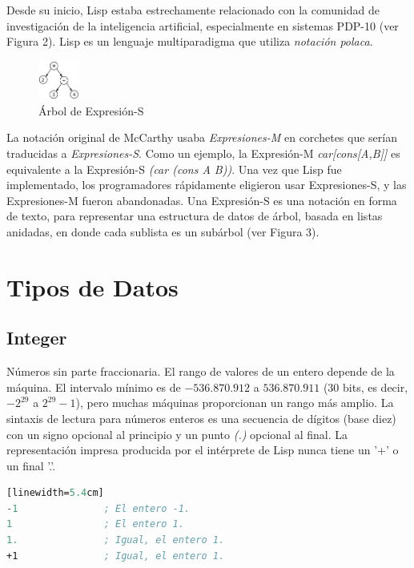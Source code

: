 \documentclass[10pt,journal,compsoc]{IEEEtran}
\begin{document}
Desde su inicio, Lisp estaba estrechamente relacionado con la comunidad de investigaci\'on de la inteligencia artificial, especialmente en sistemas PDP-10 (ver Figura 2). Lisp es un lenguaje multiparadigma  que utiliza \emph{notaci\'on polaca}. 

\begin{figure}
	\centering
	\includegraphics[width=0.12\textwidth]{s-expression.png}
	\caption{\label{fig:S-Expression}\'Arbol de Expresi\'on-S}
\end{figure}

La notaci\'on original de McCarthy usaba \emph{Expresiones-M} en corchetes que ser\'ian traducidas a \emph{Expresiones-S}. Como un ejemplo, la Expresi\'on-M \emph{car[cons[A,B]]} es equivalente a la Expresi\'on-S \emph{(car (cons A B))}. Una vez que Lisp fue implementado, los programadores r\'apidamente eligieron usar Expresiones-S, y las Expresiones-M fueron abandonadas. Una Expresi\'on-S es una notaci\'on en forma de texto, para representar una estructura de datos de \'arbol, basada en listas anidadas, en donde cada sublista es un sub\'arbol (ver Figura 3).

\section{Tipos de Datos}


\subsection{Integer}
N\'umeros sin parte fraccionaria. El rango de valores de un entero depende de la m\'aquina. El intervalo m\'inimo es de $-536.870.912$ a $536.870.911$ ($30$ bits, es decir, $-2^{29}$ a $2^{29}-1$), pero muchas m\'aquinas proporcionan un rango m\'as amplio. La sintaxis de lectura para n\'umeros enteros es una secuencia de d\'igitos (base diez) con un signo opcional al principio y un punto \emph{(.)} opcional al final. La representaci\'on impresa producida por el int\'erprete de Lisp nunca tiene un '+' o un final '.'. 

\begin{lstlisting}[language=Lisp, caption = {C\'odigo de tipo de dato Integer en Lisp}][linewidth=5.4cm]
-1               ; El entero -1.
1                ; El entero 1.
1.               ; Igual, el entero 1.
+1               ; Igual, el entero 1.
\end{lstlisting}
\end{document}
